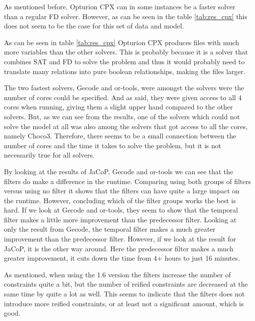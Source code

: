 As mentioned before. Opturion CPX can in some instances be a faster solver than a regular FD solver. However, as can be seen in the table \ref{tab:res_cpx} this does not seem to be the case for this set of data and model.

As can be seen in table \ref{tab:res_cpx} Opturion CPX produces files with much more variables than the other solvers. This is probably because it is a solver that combines SAT and FD to solve the problem and thus it would probably need to translate many relations into pure boolean relationships, making the files larger.

The two fastest solvers, Gecode and or-tools, were amongst the solvers were the number of cores could be specified. And as said, they were given access to all 4 cores when running, giving them a slight upper hand compared to the other solvers. But, as we can see from the results, one of the solvers which could not solve the model at all was also among the solvers that got access to all the cores, namely Choco3. Therefore, there seems to be a small connection between the number of cores and the time it takes to solve the problem, but it is not necessarily true for all solvers.

By looking at the results of JaCoP, Gecode and or-tools we can see that the filters do make a difference in the runtime. Comparing using both groups of filters versus using no filter it shows that the filters can have quite a large impact on the runtime. However, concluding which of the filter groups works the best is hard. If we look at Gecode and or-tools, they seem to show that the temporal filter makes a little more improvement than the predecessor filter. Looking at only the result from Gecode, the temporal filter makes a much greater improvement than the predecessor filter. However, if we look at the result for JaCoP, it is the other way around. Here the predecessor filter makes a much greater improvement, it cuts down the time from 4+ hours to just 16 minutes.

As mentioned, when using the 1.6 version the filters increase the number of constraints quite a bit, but the number of reified constraints are decreased at the same time by quite a lot as well. This seems to indicate that the filters does not introduce more reified constraints, or at least not a significant amount, which is good.

